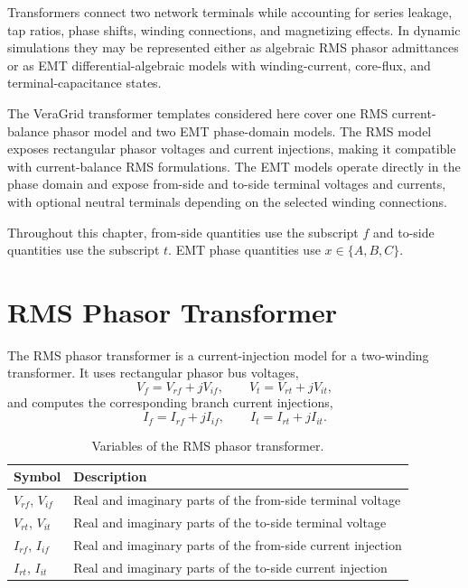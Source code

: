 Transformers connect two network terminals while accounting for series leakage, tap ratios, phase shifts, winding connections, and magnetizing effects. In dynamic simulations they may be represented either as algebraic RMS phasor admittances or as EMT differential-algebraic models with winding-current, core-flux, and terminal-capacitance states.

The VeraGrid transformer templates considered here cover one RMS current-balance phasor model and two EMT phase-domain models. The RMS model exposes rectangular phasor voltages and current injections, making it compatible with current-balance RMS formulations. The EMT models operate directly in the phase domain and expose from-side and to-side terminal voltages and currents, with optional neutral terminals depending on the selected winding connections.

Throughout this chapter, from-side quantities use the subscript $f$ and to-side quantities use the subscript $t$. EMT phase quantities use $x\in\{A,B,C\}$.

\section{RMS Phasor Transformer}

The RMS phasor transformer is a current-injection model for a two-winding transformer. It uses rectangular phasor bus voltages,
\begin{equation}
    V_f = V_{rf}+jV_{if}, \qquad V_t = V_{rt}+jV_{it},
\end{equation}
and computes the corresponding branch current injections,
\begin{equation}
    I_f = I_{rf}+jI_{if}, \qquad I_t = I_{rt}+jI_{it}.
\end{equation}

\begin{table}[H]
    \centering
    \caption{Variables of the RMS phasor transformer.}
    \begin{tabular}{ll}
        \toprule
        Symbol & Description \\
        \midrule
        $V_{rf}$, $V_{if}$ & Real and imaginary parts of the from-side terminal voltage \\
        $V_{rt}$, $V_{it}$ & Real and imaginary parts of the to-side terminal voltage \\
        $I_{rf}$, $I_{if}$ & Real and imaginary parts of the from-side current injection \\
        $I_{rt}$, $I_{it}$ & Real and imaginary parts of the to-side current injection \\
        \bottomrule
    \end{tabular}
\end{table}

